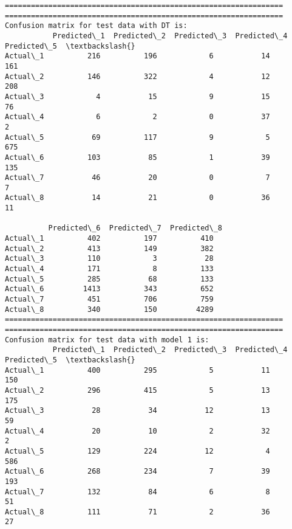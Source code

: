 \documentclass[11pt]{article}
\begin{document}
    \begin{Verbatim}[commandchars=\\\{\}]
================================================================
================================================================
Confusion matrix for test data with DT is:
           Predicted\_1  Predicted\_2  Predicted\_3  Predicted\_4  Predicted\_5  \textbackslash{}
Actual\_1          216          196            6           14          161   
Actual\_2          146          322            4           12          208   
Actual\_3            4           15            9           15           76   
Actual\_4            6            2            0           37            2   
Actual\_5           69          117            9            5          675   
Actual\_6          103           85            1           39          135   
Actual\_7           46           20            0            7            7   
Actual\_8           14           21            0           36           11   

          Predicted\_6  Predicted\_7  Predicted\_8  
Actual\_1          402          197          410  
Actual\_2          413          149          382  
Actual\_3          110            3           28  
Actual\_4          171            8          133  
Actual\_5          285           68          133  
Actual\_6         1413          343          652  
Actual\_7          451          706          759  
Actual\_8          340          150         4289  
================================================================
================================================================
Confusion matrix for test data with model 1 is:
           Predicted\_1  Predicted\_2  Predicted\_3  Predicted\_4  Predicted\_5  \textbackslash{}
Actual\_1          400          295            5           11          150   
Actual\_2          296          415            5           13          175   
Actual\_3           28           34           12           13           59   
Actual\_4           20           10            2           32            2   
Actual\_5          129          224           12            4          586   
Actual\_6          268          234            7           39          193   
Actual\_7          132           84            6            8           51   
Actual\_8          111           71            2           36           27   


\end{Verbatim}
\end{document}
